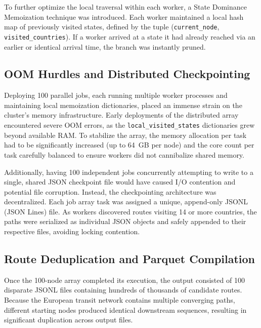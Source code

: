 \medskip

To further optimize the local traversal within each worker, a State Dominance Memoization technique was introduced. Each worker maintained a local hash map of previously visited states, defined by the tuple (\texttt{current\_node}, \texttt{visited\_countries}). If a worker arrived at a state it had already reached via an earlier or identical arrival time, the branch was instantly pruned.

\subsection{OOM Hurdles and Distributed Checkpointing}
\label{subsec:oom_distributed_checkpointing}

Deploying 100 parallel jobs, each running multiple worker processes and maintaining local memoization dictionaries, placed an immense strain on the cluster's memory infrastructure. Early deployments of the distributed array encountered severe OOM errors, as the \texttt{local\_visited\_states} dictionaries grew beyond available RAM. To stabilize the array, the memory allocation per task had to be significantly increased (up to 64~GB per node) and the core count per task carefully balanced to ensure workers did not cannibalize shared memory.

\medskip

Additionally, having 100 independent jobs concurrently attempting to write to a single, shared JSON checkpoint file would have caused I/O contention and potential file corruption. Instead, the checkpointing architecture was decentralized. Each job array task was assigned a unique, append-only JSONL (JSON Lines) file. As workers discovered routes visiting 14 or more countries, the paths were serialized as individual JSON objects and safely appended to their respective files, avoiding locking contention.

\subsection{Route Deduplication and Parquet Compilation}
\label{subsec:dedup_parquet}

Once the 100-node array completed its execution, the output consisted of 100 disparate JSONL files containing hundreds of thousands of candidate routes. Because the European transit network contains multiple converging paths, different starting nodes produced identical downstream sequences, resulting in significant duplication across output files.

